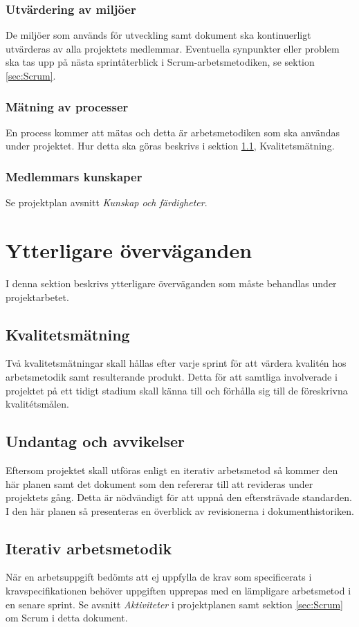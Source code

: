 \documentclass[a4paper,10pt]{article}
\begin{document}
\subsubsection{Utvärdering av miljöer}
De miljöer som används för utveckling samt dokument ska kontinuerligt utvärderas av alla projektets medlemmar. Eventuella synpunkter eller problem ska tas upp på nästa sprintåterblick i Scrum-arbetsmetodiken, se sektion \ref{sec:Scrum}.

\subsubsection{Mätning av processer}
En process kommer att mätas och detta är arbetsmetodiken som ska användas under projektet. Hur detta ska göras beskrivs i sektion \ref{sec:Kvalitetsmatning}, Kvalitetsmätning.

\subsubsection{Medlemmars kunskaper}
Se projektplan avsnitt \emph{Kunskap och färdigheter}.

\section{Ytterligare överväganden}
I denna sektion beskrivs ytterligare överväganden som måste behandlas under projektarbetet.
\subsection{Kvalitetsmätning}
\label{sec:Kvalitetsmatning}
Två kvalitetsmätningar skall hållas efter varje sprint för att värdera kvalitén hos arbetsmetodik samt resulterande produkt.
Detta för att samtliga involverade i projektet på ett tidigt stadium skall känna till och förhålla sig till de föreskrivna kvalitétsmålen.

\subsection{Undantag och avvikelser}

Eftersom projektet skall utföras enligt en iterativ arbetsmetod så kommer den här planen samt det dokument som den refererar till att revideras under projektets gång. Detta är nödvändigt för att uppnå den eftersträvade standarden. I den här planen så presenteras en överblick av revisionerna i dokumenthistoriken.

\subsection{Iterativ arbetsmetodik}
När en arbetsuppgift bedömts att ej uppfylla de krav som specificerats i kravspecifikationen behöver uppgiften upprepas med en lämpligare arbetsmetod i en senare sprint. Se avsnitt \emph{Aktiviteter} i projektplanen samt sektion \ref{sec:Scrum} om Scrum i detta dokument.
\end{document}
